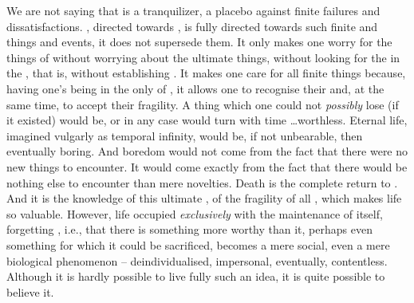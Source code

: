 We are not saying that  is a tranquilizer, a placebo against
finite failures and  dissatisfactions. , directed towards
, is fully directed towards such finite and  things
and events, it does not supersede them. It only makes one worry for the things
of  without worrying about the ultimate things, without looking
for the  in the , that is, without establishing
.
%
It makes one care for all finite things because, having  one's being
in the only  of , it allows one to recognise their
 and, at the same time, to accept their fragility. A
thing which one could not {\em possibly} lose (if it existed) would be, or in
any case would turn with time \ldots worthless. Eternal life, imagined vulgarly
as temporal infinity, would be, if not unbearable, then eventually boring. And
boredom would not come from the fact that there were no new things to encounter.
It would come exactly from the fact that there would be nothing else to
encounter than mere novelties.  Death is the complete return to
. And it is the knowledge of this ultimate ,
of the fragility of all , which makes life so valuable. However,
life occupied {\em exclusively} with the maintenance of itself, forgetting
, i.e., that there is something more worthy than it, perhaps even
something for which it could be sacrificed, becomes a mere social, even a mere
biological phenomenon -- deindividualised, impersonal, eventually, contentless.
Although it is hardly possible to live fully such an idea, it is quite possible
to  believe it.

